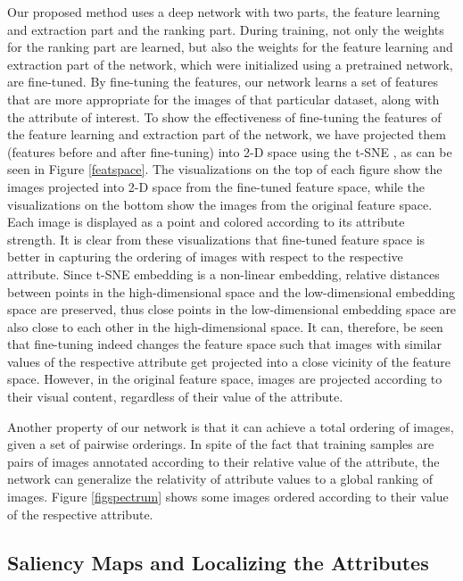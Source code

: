 Our proposed method uses a deep network with two parts, the feature learning and extraction part and the ranking part. During training, not only the weights for the ranking part are learned, but also the weights for the feature learning and extraction part of the network, which were initialized using a pretrained network, are fine-tuned. By fine-tuning the features, our network learns a set of features that are more appropriate for the images of that particular dataset, along with the attribute of interest. To show the effectiveness of fine-tuning the features of the feature learning and extraction part of the network, we have projected them (features before and after fine-tuning) into 2-D space using the t-SNE \cite{van2008visualizing}, as can be seen in Figure \ref{featspace}. The visualizations on the top of each figure show the images projected into 2-D space from the fine-tuned feature space, while the visualizations on the bottom show the images from the original feature space. Each image is displayed as a point and colored according to its attribute strength. It is clear from these visualizations that fine-tuned feature space is better in capturing the ordering of images with respect to the respective attribute. Since t-SNE embedding is a non-linear embedding, relative distances between points in the high-dimensional space and the low-dimensional embedding space are preserved, thus close points in the low-dimensional embedding space are also close to each other in the high-dimensional space. It can, therefore, be seen that fine-tuning indeed changes the feature space such that images with similar values of the respective attribute get projected into a close vicinity of the feature space. However, in the original feature space, images are projected according to their visual content, regardless of their value of the attribute.

Another property of our network is that it can achieve a total ordering of images, given a set of pairwise orderings. In spite of the fact that training samples are pairs of images annotated according to their relative value of the attribute, the network can generalize the relativity of attribute values to a global ranking of images. Figure \ref{figspectrum} shows some images ordered according to their value of the respective attribute. 

\subsection{Saliency Maps and Localizing the Attributes} \label{sec.4.5}

